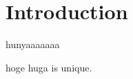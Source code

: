 \section{Introduction}\label{sec:intro}
hunyaaaaaaa

\begin{theorem}\label{thm:t1}
	hoge huga is unique.
\end{theorem}